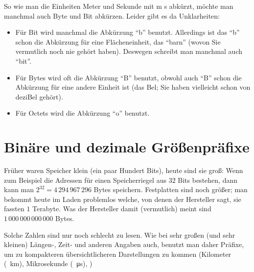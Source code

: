 So wie man die Einheiten Meter und Sekunde mit \si{m} \bzw \si{s} abkürzt,
möchte man manchmal auch Byte und Bit abkürzen. Leider gibt es da
Unklarheiten:
\begin{itemize}
\item Für Bit wird manchmal die Abkürzung "`b"' benutzt. Allerdings
  ist das "`b"' schon die Abkürzung für eine Flächeneinheit, das
  "`barn"' (wovon Sie vermutlich noch nie gehört haben).  Deswegen
  schreibt man manchmal auch "`bit"'.
\item Für Bytes wird oft die Abkürzung "`B"' benutzt, obwohl auch
  "`B"' schon die Abkürzung für eine andere Einheit ist (das Bel;
  Sie haben vielleicht schon von deziBel gehört).
\item Für Octets wird die Abkürzung "`o"' benutzt.
\end{itemize}

\Tut\section{Bin\"{a}re und dezimale Gr\"{o}\ss enpr\"{a}fixe}

Früher waren Speicher klein (\zB ein paar Hundert Bits), heute sind
sie groß: Wenn zum Beispiel die Adressen für einen Speicherriegel aus
$32$ Bits bestehen, dann kann man $2^{32} = 4\,294\,967\,296$ Bytes
speichern. Festplatten sind noch größer; man bekommt heute im Laden
problemlos welche, von denen der Hersteller sagt, sie fassten $1$
Terabyte. Was der Hersteller damit (vermutlich) meint sind
$1\,000\,000\,000\,000$ Bytes.

Solche Zahlen sind nur noch schlecht zu lesen. Wie bei sehr großen
(und sehr kleinen) Längen-, Zeit- und anderen Angaben auch, benutzt
man daher Präfixe, um zu kompakteren übersichtlicheren Darstellungen
zu kommen (Kilometer (\SI{}{\kilo\meter}), Mikrosekunde
(\SI{}{\micro\second}), \usw)

